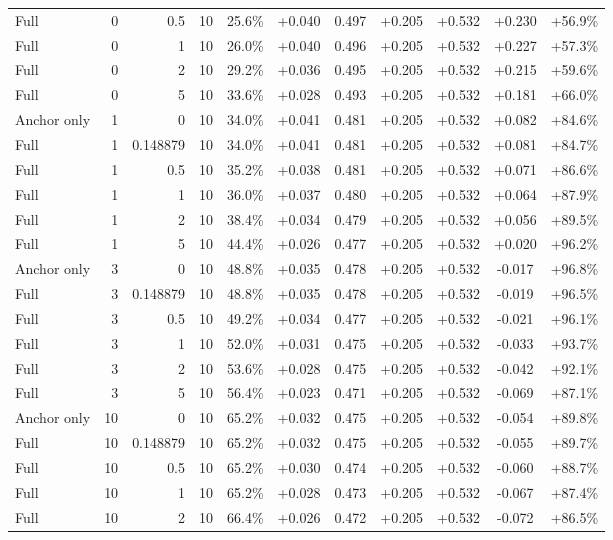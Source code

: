 \begin{table}[htbp]
\begin{tabular}{lrrrccccccc}
Full & 0 & 0.5 & 10 & 25.6\% & +0.040 & 0.497 & +0.205 & +0.532 & +0.230 & +56.9\% \\
Full & 0 & 1 & 10 & 26.0\% & +0.040 & 0.496 & +0.205 & +0.532 & +0.227 & +57.3\% \\
Full & 0 & 2 & 10 & 29.2\% & +0.036 & 0.495 & +0.205 & +0.532 & +0.215 & +59.6\% \\
Full & 0 & 5 & 10 & 33.6\% & +0.028 & 0.493 & +0.205 & +0.532 & +0.181 & +66.0\% \\
Anchor only & 1 & 0 & 10 & 34.0\% & +0.041 & 0.481 & +0.205 & +0.532 & +0.082 & +84.6\% \\
Full & 1 & 0.148879 & 10 & 34.0\% & +0.041 & 0.481 & +0.205 & +0.532 & +0.081 & +84.7\% \\
Full & 1 & 0.5 & 10 & 35.2\% & +0.038 & 0.481 & +0.205 & +0.532 & +0.071 & +86.6\% \\
Full & 1 & 1 & 10 & 36.0\% & +0.037 & 0.480 & +0.205 & +0.532 & +0.064 & +87.9\% \\
Full & 1 & 2 & 10 & 38.4\% & +0.034 & 0.479 & +0.205 & +0.532 & +0.056 & +89.5\% \\
Full & 1 & 5 & 10 & 44.4\% & +0.026 & 0.477 & +0.205 & +0.532 & +0.020 & +96.2\% \\
Anchor only & 3 & 0 & 10 & 48.8\% & +0.035 & 0.478 & +0.205 & +0.532 & -0.017 & +96.8\% \\
Full & 3 & 0.148879 & 10 & 48.8\% & +0.035 & 0.478 & +0.205 & +0.532 & -0.019 & +96.5\% \\
Full & 3 & 0.5 & 10 & 49.2\% & +0.034 & 0.477 & +0.205 & +0.532 & -0.021 & +96.1\% \\
Full & 3 & 1 & 10 & 52.0\% & +0.031 & 0.475 & +0.205 & +0.532 & -0.033 & +93.7\% \\
Full & 3 & 2 & 10 & 53.6\% & +0.028 & 0.475 & +0.205 & +0.532 & -0.042 & +92.1\% \\
Full & 3 & 5 & 10 & 56.4\% & +0.023 & 0.471 & +0.205 & +0.532 & -0.069 & +87.1\% \\
Anchor only & 10 & 0 & 10 & 65.2\% & +0.032 & 0.475 & +0.205 & +0.532 & -0.054 & +89.8\% \\
Full & 10 & 0.148879 & 10 & 65.2\% & +0.032 & 0.475 & +0.205 & +0.532 & -0.055 & +89.7\% \\
Full & 10 & 0.5 & 10 & 65.2\% & +0.030 & 0.474 & +0.205 & +0.532 & -0.060 & +88.7\% \\
Full & 10 & 1 & 10 & 65.2\% & +0.028 & 0.473 & +0.205 & +0.532 & -0.067 & +87.4\% \\
Full & 10 & 2 & 10 & 66.4\% & +0.026 & 0.472 & +0.205 & +0.532 & -0.072 & +86.5\% \\

\end{tabular}
\end{table}
